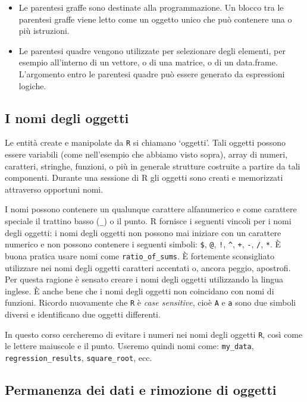 \documentclass[
]{memoir}
\theoremstyle{definition}
\theoremstyle{definition}
\theoremstyle{definition}
\theoremstyle{definition}
\theoremstyle{remark}
\begin{document}
\begin{itemize}
\item
  Le parentesi graffe sono destinate alla programmazione. Un blocco
  tra le parentesi graffe viene letto come un oggetto unico che può
  contenere una o più istruzioni.
\item
  Le parentesi quadre vengono utilizzate per selezionare degli
  elementi, per esempio all'interno di un vettore, o di una matrice, o
  di un data.frame. L'argomento entro le parentesi quadre può essere
  generato da espressioni logiche.
\end{itemize}

\hypertarget{i-nomi-degli-oggetti}{%
\subsection{I nomi degli oggetti}\label{i-nomi-degli-oggetti}}

Le entità create e manipolate da \texttt{R} si chiamano `oggetti'. Tali oggetti
possono essere variabili (come nell'esempio che abbiamo visto sopra), array di numeri, caratteri, stringhe, funzioni, o più in generale strutture costruite a partire da tali
componenti. Durante una sessione di R gli oggetti sono creati e
memorizzati attraverso opportuni nomi.

I nomi possono contenere un qualunque carattere alfanumerico e come
carattere speciale il trattino basso (\texttt{\_}) o il punto. R fornisce i
seguenti vincoli per i nomi degli oggetti: i nomi degli oggetti non
possono mai iniziare con un carattere numerico e non possono contenere i
seguenti simboli: \texttt{\$}, \texttt{@}, \texttt{!}, \texttt{\^{}}, \texttt{+}, \texttt{-}, \texttt{/}, \texttt{*}. È buona
pratica usare nomi come \texttt{ratio\_of\_sums}. È fortemente sconsigliato
utilizzare nei nomi degli oggetti caratteri accentati o, ancora peggio,
apostrofi. Per questa ragione è sensato creare i nomi degli oggetti
utilizzando la lingua inglese. È anche bene che i nomi degli oggetti non
coincidano con nomi di funzioni. Ricordo nuovamente che \texttt{R} è \emph{case sensitive}, cioè
\texttt{A} e \texttt{a} sono due simboli diversi e identificano due oggetti
differenti.

In questo corso cercheremo di evitare i numeri nei nomi degli oggetti \texttt{R}, così come le lettere maiuscole e il punto. Useremo quindi nomi come: \texttt{my\_data}, \texttt{regression\_results}, \texttt{square\_root}, ecc.

\hypertarget{permanenza-dei-dati-e-rimozione-di-oggetti}{%
\subsection{Permanenza dei dati e rimozione di oggetti}\label{permanenza-dei-dati-e-rimozione-di-oggetti}}
\end{document}
